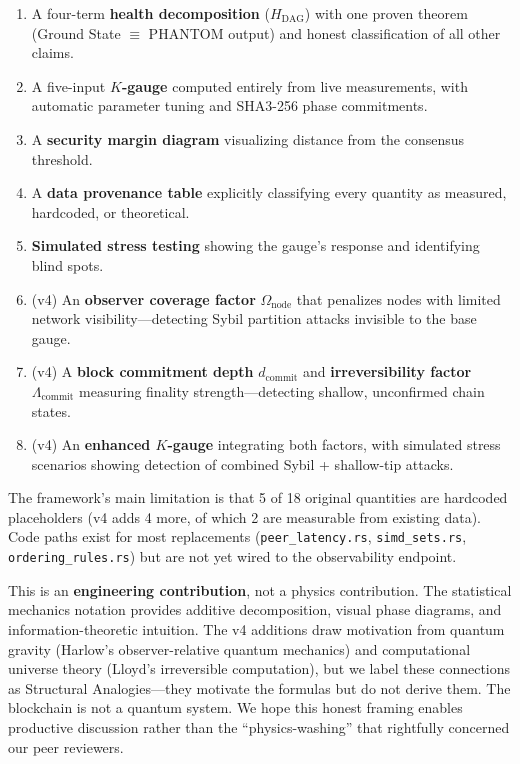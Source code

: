 \documentclass[11pt,a4paper]{article}
\begin{document}
\begin{enumerate}[nosep]
    \item A four-term \textbf{health decomposition} ($H_{\text{DAG}}$) with one proven theorem (Ground State $\equiv$ PHANTOM output) and honest classification of all other claims.
    \item A five-input \textbf{$K$-gauge} computed entirely from live measurements, with automatic parameter tuning and SHA3-256 phase commitments.
    \item A \textbf{security margin diagram} visualizing distance from the consensus threshold.
    \item A \textbf{data provenance table} explicitly classifying every quantity as measured, hardcoded, or theoretical.
    \item \textbf{Simulated stress testing} showing the gauge's response and identifying blind spots.
    \item (v4) An \textbf{observer coverage factor} $\Omega_{\text{node}}$ that penalizes nodes with limited network visibility---detecting Sybil partition attacks invisible to the base gauge.
    \item (v4) A \textbf{block commitment depth} $d_{\text{commit}}$ and \textbf{irreversibility factor} $\Lambda_{\text{commit}}$ measuring finality strength---detecting shallow, unconfirmed chain states.
    \item (v4) An \textbf{enhanced $K$-gauge} integrating both factors, with simulated stress scenarios showing detection of combined Sybil + shallow-tip attacks.
\end{enumerate}

The framework's main limitation is that 5 of 18 original quantities are hardcoded placeholders (v4 adds 4 more, of which 2 are measurable from existing data). Code paths exist for most replacements (\texttt{peer\_latency.rs}, \texttt{simd\_sets.rs}, \texttt{ordering\_rules.rs}) but are not yet wired to the observability endpoint.

This is an \textbf{engineering contribution}, not a physics contribution. The statistical mechanics notation provides additive decomposition, visual phase diagrams, and information-theoretic intuition. The v4 additions draw motivation from quantum gravity (Harlow's observer-relative quantum mechanics) and computational universe theory (Lloyd's irreversible computation), but we label these connections as \textcolor{theoretical}{Structural Analogies}---they motivate the formulas but do not derive them. The blockchain is not a quantum system. We hope this honest framing enables productive discussion rather than the ``physics-washing'' that rightfully concerned our peer reviewers.
\end{document}
